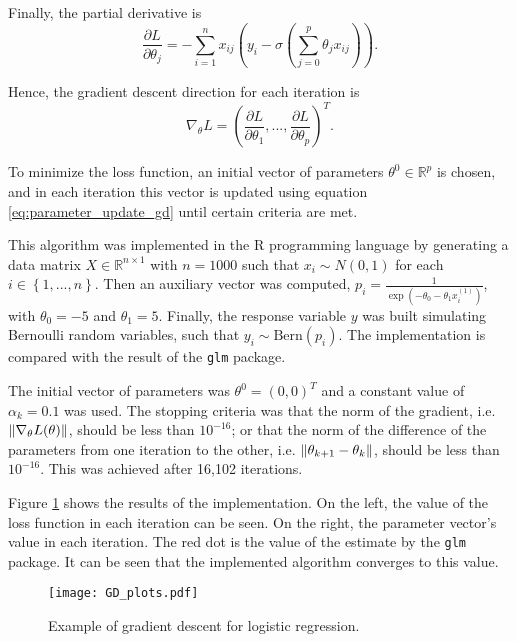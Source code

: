 Finally, the partial derivative is
\begin{equation}
  \frac{\partial L}{\partial \theta_j} = - \sum_{i = 1}^n { x_{ij}(y_i - \sigma(\sum_{j=0}^{p}{\theta_j x_{ij}})) }.
\end{equation}

Hence, the gradient descent direction for each iteration is
\begin{equation}
  \nabla_{\theta} L = \left( \frac{\partial L}{\partial \theta_1}, ..., \frac{\partial L}{\partial \theta_p} \right)^T.
\end{equation}

To minimize the loss function, an initial vector of parameters $\theta^0 \in \mathbb{R}^p$ is chosen, and in each iteration this vector is updated using equation \eqref{eq:parameter_update_gd} until certain criteria are met.

This algorithm was implemented in the R programming language \cite{R_manual} by generating a data matrix $X \in \mathbb{R}^{n \times 1}$ with $n = 1000$ such that $x_i \sim N(0, 1)$ for each $i \in \left\{1, ..., n \right\}$.
Then an auxiliary vector was computed, $p_i = \frac{1}{\exp \left( - \theta_0 - \theta_1 x_i^{(1)} \right)}$, with $\theta_0 = -5$ and $\theta_1 = 5$. Finally, the response variable $y$ was built simulating Bernoulli random variables, such that $y_i \sim \mathrm{Bern}(p_i)$.
The implementation is compared with the result of the \texttt{glm} package.

The initial vector of parameters was $\theta^0 = (0, 0)^T$ and a constant value of $\alpha_k = 0.1$ was used. The stopping criteria was that the norm of the gradient, i.e. $\left\lVert \nabla_{\theta} L(\theta) \right\rVert$, should be less than $10^{-16}$; or that the norm of the difference of the parameters from one iteration to the other, i.e. $\left\lVert \theta_{k+1} - \theta_k \right\rVert$, should be less than $10^{-16}$. This was achieved after 16,102 iterations.

Figure \ref{fig:GD_plots} shows the results of the implementation. On the left, the value of the loss function in each iteration can be seen. On the right, the parameter vector's value in each iteration. The red dot is the value of the estimate by the \texttt{glm} package. It can be seen that the implemented algorithm converges to this value.

\begin{figure}[H]
    \centering
    \texttt{[image: GD\_plots.pdf]}
    \caption{Example of gradient descent for logistic regression.}
    \label{fig:GD_plots}
\end{figure}

